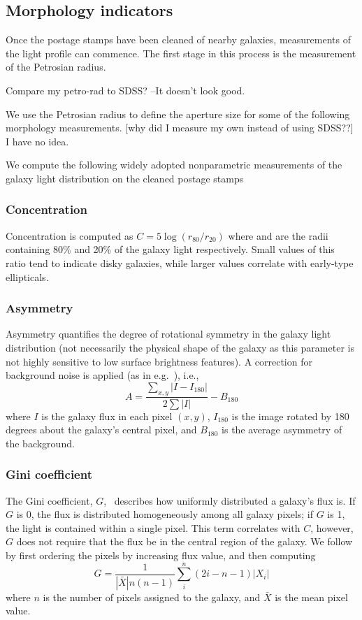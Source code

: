 \subsection{Morphology indicators}
Once the postage stamps have been cleaned of nearby galaxies, measurements of the light profile can commence. The first stage in this process is the measurement of the Petrosian radius. 

Compare my petro-rad to SDSS? --It doesn't look good. 

We use the Petrosian radius to define the aperture size for some of the following morphology measurements. [why did I measure my own instead of using SDSS??] I have no idea. 

We compute the following widely adopted nonparametric measurements of the galaxy light distribution on the cleaned postage stamps


\subsubsection{Concentration}
Concentration is computed as $C = 5\log(r_{80}/ r_{20})$ where  and  are the
radii containing 80\% and 20\% of the galaxy light respectively.  Small values of this ratio 
tend to indicate disky galaxies, while larger values correlate with early-type ellipticals. 

\subsubsection{Asymmetry}
Asymmetry quantifies the degree of rotational symmetry in the galaxy light distribution (not necessarily the physical shape of the galaxy as this parameter is not highly sensitive to low surface brightness features). A correction for background noise is applied (as in e.g.~\cite{Conselice2000}), i.e., 
\begin{equation}
A = \frac{\sum_{x,y} |I - I_{180}|}{ 2\sum|I|} - B_{180}
\end{equation}
where $I$ is the galaxy flux in each pixel $(x, y)$, $I_{180}$ is the image rotated by 180 degrees about the galaxy's central pixel, and $B_{180}$ is the average asymmetry of the background. 

\subsubsection{Gini coefficient}
The Gini coefficient, $G$,~\citep{Glasser1962, Abraham2003} describes how uniformly distributed a galaxy's flux is.  If $G$ is 0, the flux is distributed homogeneously among all galaxy pixels; if $G$ is 1,  the light is contained within a single pixel. This term correlates with $C$, however, $G$ does not require that the flux be in the central region of the galaxy.  We follow~\cite{Lotz2004} by first ordering the pixels by increasing flux value, and then computing
\begin{equation}
G = \frac{1}{|\bar X|n(n-1)}\sum_i^n(2i-n-1)|X_i|
\end{equation}
where $n$ is the number of pixels assigned to the galaxy, and $\bar X$ is the mean pixel value. 

